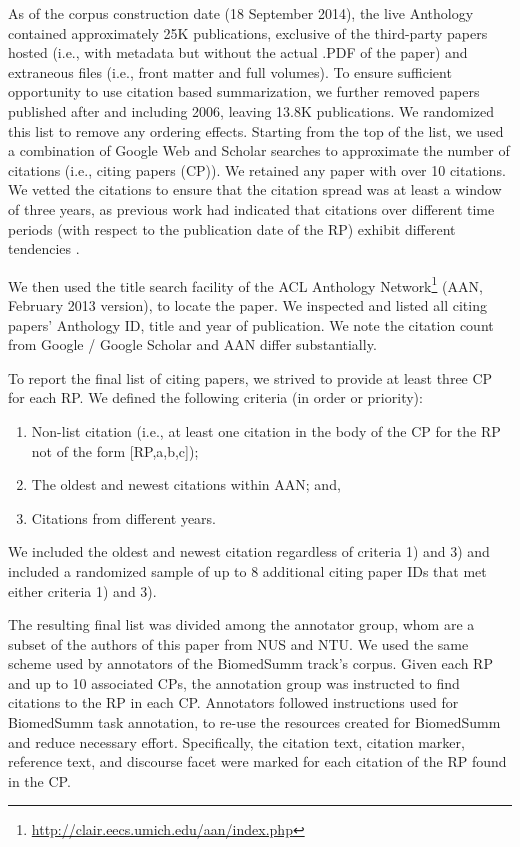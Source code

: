 \documentclass[11pt]{article}
\begin{document}
As of the corpus construction date (18 September 2014), the live
Anthology contained approximately 25K publications, exclusive of the
third-party papers hosted (i.e., with metadata but without the actual
.PDF of the paper) and extraneous files (i.e., front matter and full
volumes).  To ensure sufficient opportunity to use citation based
summarization, we further removed papers published after and including
2006, leaving 13.8K publications.  We randomized this list to remove
any ordering effects.  Starting from the top of the list, we used a
combination of Google Web and Scholar searches to approximate the
number of citations (i.e., citing papers (CP)). We retained any paper
with over 10 citations.  We vetted the citations to ensure that the
citation spread was at least a window of three years, as previous work
had indicated that citations over different time periods (with respect
to the publication date of the RP) exhibit different tendencies
\cite{Drago's work}.

We then used the title search facility of the ACL Anthology
Network\footnote{\url{http://clair.eecs.umich.edu/aan/index.php}}
(AAN, February 2013 version), to locate the paper. We inspected and
listed all citing papers' Anthology ID, title and year of publication.
We note the citation count from Google / Google Scholar and AAN differ
substantially.

To report the final list of citing papers, we strived to provide at
least three CP for each RP. We defined the following
criteria (in order or priority):
\begin{enumerate}
\item Non-list citation (i.e., at least one citation in the body of
  the CP for the RP not of the form [RP,a,b,c]);
\vspace{-.3cm}
\item The oldest and newest
citations within AAN; and, 
\vspace{-.3cm}
\item Citations from different years. 
\end{enumerate}

We included the oldest and newest citation regardless of criteria 1)
and 3) and included a randomized sample of up to 8 additional citing
paper IDs that met either criteria 1) and 3). 

The resulting final list was divided among the annotator group, whom
are a subset of the authors of this paper from NUS and NTU.  We used
the same scheme used by annotators of the BiomedSumm track's corpus.
Given each RP and up to 10 associated CPs, the annotation group was
instructed to find citations to the RP in each CP. Annotators followed
instructions used for BiomedSumm task annotation, to re-use the
resources created for BiomedSumm and reduce necessary effort.
Specifically, the citation text, citation marker, reference text, and
discourse facet were marked for each citation of the RP found in the
CP.
\end{document}
